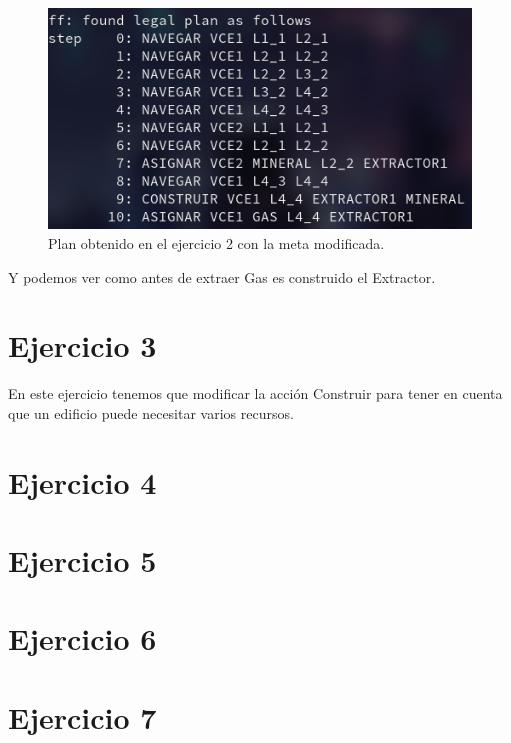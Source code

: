 \documentclass[11pt, spanish]{article}
\begin{document}
\begin{figure}[H]
	\centering
	\includegraphics[scale=0.4]{plan2Gas.png}
	\caption{Plan obtenido en el ejercicio 2 con la meta modificada.}
	\label{plan1}
\end{figure}

Y podemos ver como antes de extraer Gas es construido el Extractor.

\section{Ejercicio 3}

En este ejercicio tenemos que modificar la acción Construir para tener en cuenta que un edificio puede necesitar varios recursos.

\section{Ejercicio 4}


\section{Ejercicio 5}



\section{Ejercicio 6}


\section{Ejercicio 7}
\end{document}
